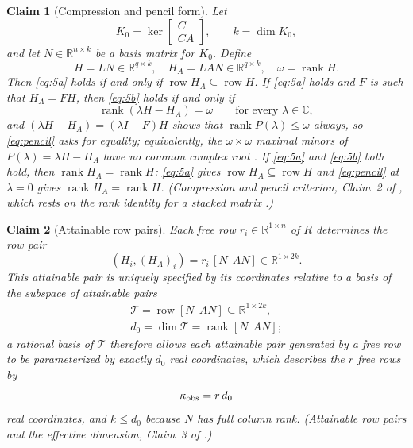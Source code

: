 ﻿\documentclass[journal]{IEEEtran}
\theoremstyle{plainn}
\newtheorem{claim}{Claim}
\theoremstyle{remark}
\begin{document}
\begin{claim}[Compression and pencil form]\label{claim:compress}
Let
\begin{equation*}
K_0=\ker\begin{bmatrix}C\\ CA\end{bmatrix},\qquad k=\dim K_0,
\end{equation*}
and let $N\in\mathbb R^{n\times k}$ be a basis matrix for $K_0$. Define
\begin{equation*}
H=LN\in\mathbb R^{q\times k},\quad H_A=LAN\in\mathbb R^{q\times k},\quad \omega=\operatorname{rank}H .
\end{equation*}
Then \eqref{eq:5a} holds if and only if $\operatorname{row}H_A\subseteq\operatorname{row}H$. If
\eqref{eq:5a} holds and $F$ is such that $H_A=FH$, then \eqref{eq:5b} holds if and only if
\begin{equation}\label{eq:pencil}
\operatorname{rank}(\lambda H-H_A)=\omega\qquad\text{for every }\lambda\in\mathbb C,
\end{equation}
and $(\lambda H-H_A)=(\lambda I-F)H$ shows that $\operatorname{rank}P(\lambda)\le\omega$ always, so
\eqref{eq:pencil} asks for equality; equivalently, the $\omega\times\omega$ maximal minors of
$P(\lambda)=\lambda H-H_A$ have no common complex root \cite[Ch.~IV]{lan02}. If \eqref{eq:5a} and
\eqref{eq:5b} both hold, then $\operatorname{rank}H_A=\operatorname{rank}H$: \eqref{eq:5a} gives
$\operatorname{row}H_A\subseteq\operatorname{row}H$ and \eqref{eq:pencil} at $\lambda=0$ gives
$\operatorname{rank}H_A=\operatorname{rank}H$. (Compression and pencil criterion, Claim~2 of
\cite{companion1}, which rests on the rank identity for a stacked matrix \cite[Ch.~0]{hj13}.)
\end{claim}

\begin{claim}[Attainable row pairs]\label{claim:rows}
Each free row $r_i\in\mathbb R^{1\times n}$ of $R$ determines the row pair
\begin{equation*}
(H_i,(H_A)_i)=r_i\,[N\ \ AN] \in\mathbb R^{1\times 2k}.
\end{equation*}
This attainable pair is uniquely specified by its coordinates relative to a basis of the subspace of
attainable pairs
\begin{equation*}
\begin{gathered}
\mathcal T=\operatorname{row}[N\ \ AN]\subseteq\mathbb R^{1\times 2k},\\
d_0=\dim\mathcal T=\operatorname{rank}[N\ \ AN];
\end{gathered}
\end{equation*}
a rational basis of $\mathcal T$ therefore allows each attainable pair generated by a free row to be
parameterized by exactly $d_0$ real coordinates, which describes the $r$ free rows by
\begin{equation*}
\kappa_{\rm obs}=r\,d_0
\end{equation*}
real coordinates, and $k\le d_0$ because $N$ has full column rank. (Attainable row pairs and the
effective dimension, Claim~3 of \cite{companion1}.)
\end{claim}
\end{document}
